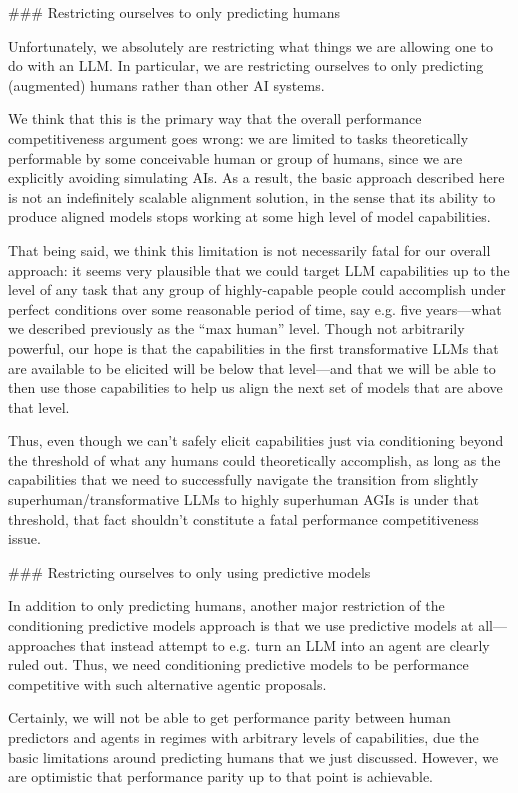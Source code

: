 {### Restricting ourselves to only predicting humans

Unfortunately, we absolutely are restricting what things we are allowing one to do with an LLM. In particular, we are restricting ourselves to only predicting (augmented) humans rather than other AI systems.

We think that this is the primary way that the overall performance competitiveness argument goes wrong: we are limited to tasks theoretically performable by some conceivable human or group of humans, since we are explicitly avoiding simulating AIs. As a result, the basic approach described here is not an indefinitely scalable alignment solution, in the sense that its ability to produce aligned models stops working at some high level of model capabilities.

That being said, we think this limitation is not necessarily fatal for our overall approach: it seems very plausible that we could target LLM capabilities up to the level of any task that any group of highly-capable people could accomplish under perfect conditions over some reasonable period of time, say e.g. five years---what we described previously as the ``max human'' level. Though not arbitrarily powerful, our hope is that the capabilities in the first transformative LLMs that are available to be elicited will be below that level---and that we will be able to then use those capabilities to help us align the next set of models that are above that level.

Thus, even though we can't safely elicit capabilities just via conditioning beyond the threshold of what any humans could theoretically accomplish, as long as the capabilities that we need to successfully navigate the transition from slightly superhuman/transformative LLMs to highly superhuman AGIs is under that threshold, that fact shouldn't constitute a fatal performance competitiveness issue.


### Restricting ourselves to only using predictive models

In addition to only predicting humans, another major restriction of the conditioning predictive models approach is that we use predictive models at all---approaches that instead attempt to e.g. turn an LLM into an agent are clearly ruled out. Thus, we need conditioning predictive models to be performance competitive with such alternative agentic proposals.

Certainly, we will not be able to get performance parity between human predictors and agents in regimes with arbitrary levels of capabilities, due the basic limitations around predicting humans that we just discussed. However, we are optimistic that performance parity up to that point is achievable.

}
